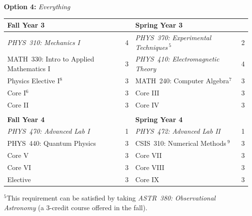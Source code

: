 \documentclass[12pt]{article}
\begin{document}
\begin{center}
{ \Large \textbf {Option 4:} {\em Everything}}
\end{center}
\begin{table}[h!]
\begin{center}
{\renewcommand{\arraystretch}{1.2}
\begin{tabular*}{0.9\textwidth}{@{\extracolsep{\fill}}lclc}


{\Large \textbf{Fall Year 3}} & & {\Large \textbf{Spring Year 3}} & \\
\hline
{\em PHYS~310: Mechanics I}         		& 4 & {\em PHYS~370: Experimental Techniques}\,$^{5}$ 	& 2 \\
MATH~330: Intro to Applied Mathematics I 	& 3 & {\em PHYS~410: Electromagnetic Theory } 			& 4  \\
Physics Elective I$^{8}$ 					& 3 &  MATH~240: Computer Algebra$^{7}$    				& 3 \\
Core I$^{6}$ 								& 3 & Core III 											&3  \\
Core II 									& 3 & Core IV 											&3  \\

 & \\
 
{\Large \textbf{Fall Year 4}} & & {\Large \textbf{Spring Year 4}} & \\
\hline
{\em PHYS~470: Advanced Lab I} 				& 1 & {\em PHYS~472: Advanced Lab II}  					& 1 \\
PHYS~440: Quantum Physics      				& 3 &  CSIS~310: Numerical Methods\,$^{9}$   						& 3 \\
Core V 										& 3 & Core VII											& 3 \\
Core VI                       				& 3 & Core VIII                							& 3 \\
Elective                      			    & 3 &Core IX                							& 3 \\
\hline
\end{tabular*}
}
\end{center}
\end{table}




\hspace{0.1in}$^{5}$This requirement can be satisfied by taking {\em ASTR~380:
  Observational Astronomy} (a 3-credit \hspace*{0.42in}course offered in the
fall).
\end{document}
